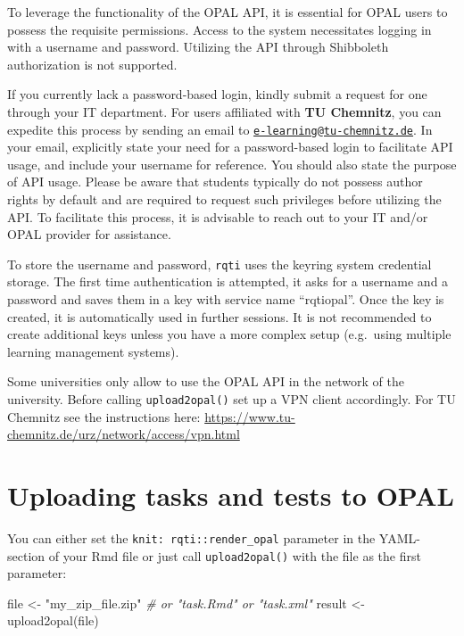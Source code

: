 \documentclass[twoside]{tufte-book}
\newenvironment{Shaded}{}{}
\newcommand{\CommentTok}[1]{\textcolor[rgb]{0.38,0.63,0.69}{\textit{#1}}}
\newcommand{\FunctionTok}[1]{\textcolor[rgb]{0.02,0.16,0.49}{#1}}
\newcommand{\NormalTok}[1]{#1}
\newcommand{\OtherTok}[1]{\textcolor[rgb]{0.00,0.44,0.13}{#1}}
\newcommand{\StringTok}[1]{\textcolor[rgb]{0.25,0.44,0.63}{#1}}
\begin{document}
To leverage the functionality of the OPAL API, it is essential for OPAL users to possess the requisite permissions. Access to the system necessitates logging in with a username and password. Utilizing the API through Shibboleth authorization is not supported.

If you currently lack a password-based login, kindly submit a request for one through your IT department. For users affiliated with \textbf{TU Chemnitz}, you can expedite this process by sending an email to \href{mailto:e-learning@tu-chemnitz.de}{\nolinkurl{e-learning@tu-chemnitz.de}}. In your email, explicitly state your need for a password-based login to facilitate API usage, and include your username for reference. You should also state the purpose of API usage. Please be aware that students typically do not possess author rights by default and are required to request such privileges before utilizing the API. To facilitate this process, it is advisable to reach out to your IT and/or OPAL provider for assistance.

To store the username and password, \texttt{rqti} uses the keyring system credential storage. The first time authentication is attempted, it asks for a username and a password and saves them in a key with service name ``rqtiopal''. Once the key is created, it is automatically used in further sessions. It is not recommended to create additional keys unless you have a more complex setup (e.g.~using multiple learning management systems).

Some universities only allow to use the OPAL API in the network of the university. Before calling \texttt{upload2opal()} set up a VPN client accordingly.
For TU Chemnitz see the instructions here: \url{https://www.tu-chemnitz.de/urz/network/access/vpn.html}

\section{Uploading tasks and tests to OPAL}\label{uploading-tasks-and-tests-to-opal}

You can either set the \texttt{knit:\ rqti::render\_opal} parameter in the YAML-section of your Rmd file or just call \texttt{upload2opal()} with the file as the first parameter:

\begin{Shaded}
\begin{Highlighting}[]
\NormalTok{file }\OtherTok{\textless{}{-}} \StringTok{"my\_zip\_file.zip"} \CommentTok{\# or "task.Rmd" or "task.xml"}
\NormalTok{result }\OtherTok{\textless{}{-}} \FunctionTok{upload2opal}\NormalTok{(file)}
\end{Highlighting}
\end{Shaded}
\end{document}

